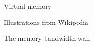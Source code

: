\documentclass[sans,mathserif]{beamer}
\begin{document}
\begin{frame}{Virtual memory}
{\tiny Illustrations from Wikipedia}
\end{frame}


\begin{frame}
  
  \begin{center}
    \Large The memory bandwidth wall
  \end{center}
\end{frame}
\end{document}

